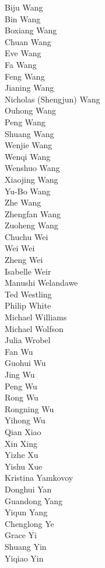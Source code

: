 Biju Wang\\
Bin Wang\\
Boxiang Wang\\
Chuan Wang\\
Eve Wang\\
Fa Wang\\
Feng Wang\\
Jianing Wang\\
Nicholas (Shengjun) Wang\\
Ouhong Wang\\
Peng Wang\\
Shuang Wang\\
Wenjie Wang\\
Wenqi Wang\\
Wenshuo Wang\\
Xiaojing Wang\\
Yu-Bo Wang\\
Zhe Wang\\
Zhengfan Wang\\
Zuoheng Wang\\
Chuchu Wei\\
Wei Wei\\
Zheng Wei\\
Isabelle Weir\\
Manushi Welandawe\\
Ted Westling\\
Philip White\\
Michael Williams\\
Michael Wolfson\\
Julia Wrobel\\
Fan Wu\\
Guohui Wu\\
Jing Wu\\
Peng Wu\\
Rong Wu\\
Rongning Wu\\
Yihong Wu\\
Qian Xiao\\
Xin Xing\\
Yizhe Xu\\
Yishu Xue\\
Kristina Yamkovoy\\
Donghui Yan\\
Guandong Yang\\
Yiqun Yang\\
Chenglong Ye\\
Grace Yi\\
Shuang Yin\\
Yiqiao Yin\\
